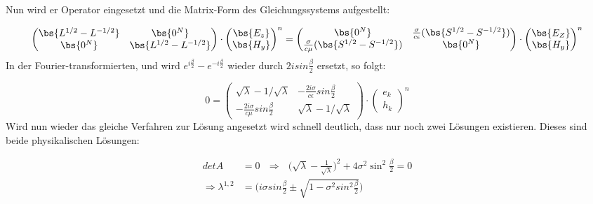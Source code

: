 \newpage

\begin{figure}[ht]
	\centering
\end{figure}
Nun wird er Operator eingesetzt und die Matrix-Form des Gleichungssystems aufgestellt:
\par
\begin{equation*}
	\begin{pmatrix} 
		\bs{L^{1/2}-L^{-1/2}} & \bs{0^N} \\
		\bs{0^N} & \bs{L^{1/2}-L^{-1/2}}
	\end{pmatrix}
	\cdot
	\begin{pmatrix}
		\bs{E_z} \\
		\bs{H_y}
	\end{pmatrix}^n
	=
	\begin{pmatrix}
		\bs{ 0^N } & \frac{\sigma}{c\epsilon}(\bs{S^{1/2}-S^{-1/2}}) \\
		\frac{\sigma}{c\mu}(\bs{S^{1/2}-S^{-1/2}}) & \bs{ 0^N }
	\end{pmatrix}
	\cdot
	\begin{pmatrix}
		\bs{E_Z} \\
		\bs{H_y}
	\end{pmatrix}^n
\end{equation*}
In der Fourier-transformierten, und wird $e^{i\frac{\beta}{2}}-e^{-i\frac{\beta}{2}}$ wieder durch $2isin\frac{\beta}{2}$ ersetzt, so folgt:
\par
\begin{equation*}
	0
	=
	\begin{pmatrix} 
		\sqrt{\lambda} - 1/\sqrt{\lambda} & -\frac{2i\sigma}{c\epsilon}sin\frac{\beta}{2}\\
		-\frac{2i\sigma}{c\mu}sin\frac{\beta}{2} & \sqrt{\lambda} - 1/\sqrt{\lambda}
	\end{pmatrix}
	\cdot
	\begin{pmatrix}
		e_k \\
		h_k
	\end{pmatrix}^n
\end{equation*}
Wird nun wieder das gleiche Verfahren zur L\"osung angesetzt wird schnell deutlich, dass nur noch zwei L\"osungen existieren. Dieses sind beide physikalischen L\"osungen:
\par
\begin{align*}
	det A &= 0 ~~~\Rightarrow~~~ \bigg(\sqrt{\lambda} - \frac{1}{\sqrt{\lambda}}\bigg)^2 + 4\sigma^2\sin^2\frac{\beta}{2} = 0 \\
	\Rightarrow \lambda^{1,2} &= \bigg(i\sigma sin\frac{\beta}{2} \pm \sqrt{1-\sigma^2sin^2\frac{\beta}{2}}\bigg)
\end{align*}
